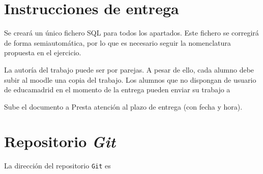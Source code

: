 \section{Instrucciones de entrega}
Se creará un único fichero SQL para todos los apartados. Este fichero se corregirá de forma semiautomática, por lo que es necesario seguir la nomenclatura propuesta en el ejercicio.

La autoría del trabajo puede ser por parejas. A pesar de ello, cada alumno debe subir al moodle una copia del trabajo. Los alumnos que no dispongan de usuario de educamadrid en el momento de la entrega pueden enviar su trabajo a 


Sube el documento a 
Presta atención al plazo de entrega (con fecha y hora).

\section{Repositorio \textit{Git}}
La dirección del repositorio \texttt{Git} es 
  






